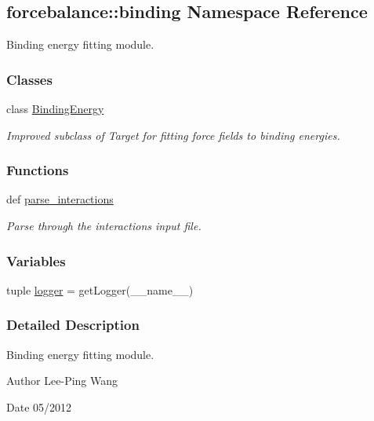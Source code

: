 \hypertarget{namespaceforcebalance_1_1binding}{\subsection{forcebalance\-:\-:binding \-Namespace \-Reference}
\label{namespaceforcebalance_1_1binding}
}


\-Binding energy fitting module.  


\subsubsection*{\-Classes}
\begin{DoxyCompactItemize}
\item 
class \hyperlink{classforcebalance_1_1binding_1_1BindingEnergy}{\-Binding\-Energy}
\begin{DoxyCompactList}\small\item\em \-Improved subclass of \-Target for fitting force fields to binding energies. \end{DoxyCompactList}\end{DoxyCompactItemize}
\subsubsection*{\-Functions}
\begin{DoxyCompactItemize}
\item 
def \hyperlink{namespaceforcebalance_1_1binding_a0ae2f9f7a4ab7f4c64f8826de52331e9}{parse\-\_\-interactions}
\begin{DoxyCompactList}\small\item\em \-Parse through the interactions input file. \end{DoxyCompactList}\end{DoxyCompactItemize}
\subsubsection*{\-Variables}
\begin{DoxyCompactItemize}
\item 
tuple \hyperlink{namespaceforcebalance_1_1binding_a9573ed198e78a3f38380c1d16cbf9b36}{logger} = get\-Logger(\-\_\-\-\_\-name\-\_\-\-\_\-)
\end{DoxyCompactItemize}


\subsubsection{\-Detailed \-Description}
\-Binding energy fitting module. \begin{DoxyAuthor}{\-Author}
\-Lee-\/\-Ping \-Wang 
\end{DoxyAuthor}
\begin{DoxyDate}{\-Date}
05/2012 
\end{DoxyDate}


